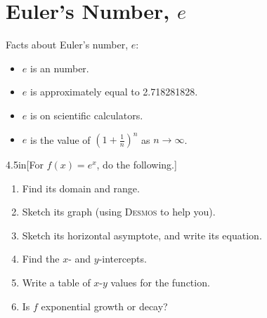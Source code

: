 \section{Euler's Number, $e$}

Facts about Euler's number, $e$:\par
\begin{minipage}{0.49\textwidth}
\begin{itemize}[nosep]
    \item $e$ is an  number.
    \item $e$ is approximately equal to 2.718281828.
\end{itemize}
\end{minipage}
\begin{minipage}{0.49\textwidth}
\begin{itemize}[nosep]
    \item $e$ is on scientific calculators.
    \item $e$ is the value of 
    \(    \left( 1 + \frac{1}{n}\right)^n    \)
    as 
    $n \rightarrow \infty$.
\end{itemize}
\end{minipage}

\begin{myWideProblem}{4.5in}[For $f(x) = e^x$, do the following.]
    {
        \small
        \begin{minipage}{0.54\textwidth}
            \begin{enumerate}[nosep]
                \item Find its domain and range.
                \item Sketch its graph (using {\scshape Desmos} to help you).
                \item Sketch its horizontal asymptote, and write its equation.
            \end{enumerate}
        \end{minipage}
        \hfil
        \begin{minipage}{0.45\textwidth}
            \begin{enumerate}[nosep]
                \setcounter{enumi}{3}
                \item Find the $x$- and $y$-intercepts.
                \item Write a table of $x$-$y$ values for the function.
                \item Is $f$ exponential growth or decay?
            \end{enumerate}
        \end{minipage}
    }
\end{myWideProblem}







